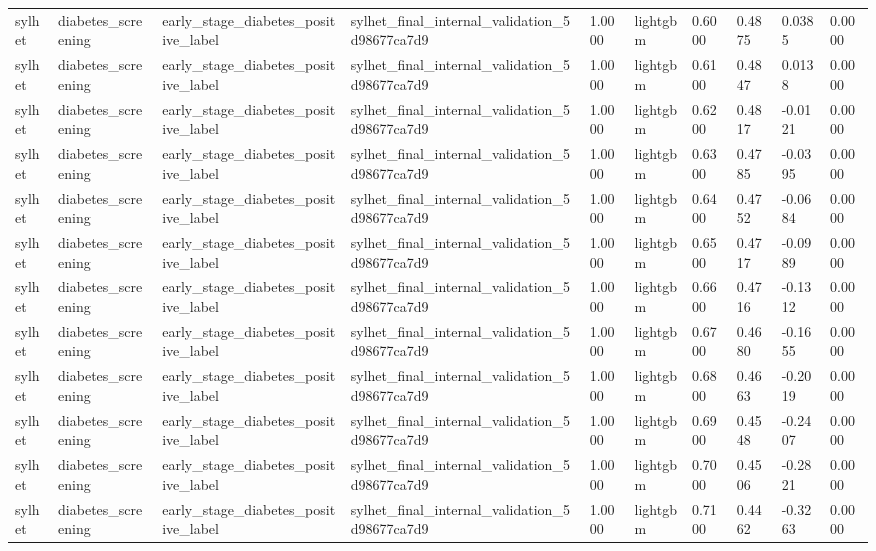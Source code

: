\begin{tabular}{llllllllll}
sylhet & diabetes\_screening & early\_stage\_diabetes\_positive\_label & sylhet\_final\_internal\_validation\_5d98677ca7d9 & 1.0000 & lightgbm & 0.6000 & 0.4875 & 0.0385 & 0.0000 \\
sylhet & diabetes\_screening & early\_stage\_diabetes\_positive\_label & sylhet\_final\_internal\_validation\_5d98677ca7d9 & 1.0000 & lightgbm & 0.6100 & 0.4847 & 0.0138 & 0.0000 \\
sylhet & diabetes\_screening & early\_stage\_diabetes\_positive\_label & sylhet\_final\_internal\_validation\_5d98677ca7d9 & 1.0000 & lightgbm & 0.6200 & 0.4817 & -0.0121 & 0.0000 \\
sylhet & diabetes\_screening & early\_stage\_diabetes\_positive\_label & sylhet\_final\_internal\_validation\_5d98677ca7d9 & 1.0000 & lightgbm & 0.6300 & 0.4785 & -0.0395 & 0.0000 \\
sylhet & diabetes\_screening & early\_stage\_diabetes\_positive\_label & sylhet\_final\_internal\_validation\_5d98677ca7d9 & 1.0000 & lightgbm & 0.6400 & 0.4752 & -0.0684 & 0.0000 \\
sylhet & diabetes\_screening & early\_stage\_diabetes\_positive\_label & sylhet\_final\_internal\_validation\_5d98677ca7d9 & 1.0000 & lightgbm & 0.6500 & 0.4717 & -0.0989 & 0.0000 \\
sylhet & diabetes\_screening & early\_stage\_diabetes\_positive\_label & sylhet\_final\_internal\_validation\_5d98677ca7d9 & 1.0000 & lightgbm & 0.6600 & 0.4716 & -0.1312 & 0.0000 \\
sylhet & diabetes\_screening & early\_stage\_diabetes\_positive\_label & sylhet\_final\_internal\_validation\_5d98677ca7d9 & 1.0000 & lightgbm & 0.6700 & 0.4680 & -0.1655 & 0.0000 \\
sylhet & diabetes\_screening & early\_stage\_diabetes\_positive\_label & sylhet\_final\_internal\_validation\_5d98677ca7d9 & 1.0000 & lightgbm & 0.6800 & 0.4663 & -0.2019 & 0.0000 \\
sylhet & diabetes\_screening & early\_stage\_diabetes\_positive\_label & sylhet\_final\_internal\_validation\_5d98677ca7d9 & 1.0000 & lightgbm & 0.6900 & 0.4548 & -0.2407 & 0.0000 \\
sylhet & diabetes\_screening & early\_stage\_diabetes\_positive\_label & sylhet\_final\_internal\_validation\_5d98677ca7d9 & 1.0000 & lightgbm & 0.7000 & 0.4506 & -0.2821 & 0.0000 \\
sylhet & diabetes\_screening & early\_stage\_diabetes\_positive\_label & sylhet\_final\_internal\_validation\_5d98677ca7d9 & 1.0000 & lightgbm & 0.7100 & 0.4462 & -0.3263 & 0.0000 \\

\end{tabular}
